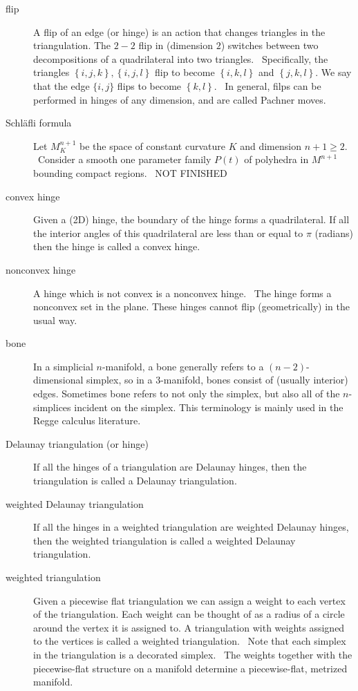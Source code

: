 \begin{description}
\item[flip] A flip of an edge (or hinge) is an action that changes triangles
in the triangulation. The $2-2$ flip in (dimension $2$) switches between two
decompositions of a quadrilateral into two triangles. \ Specifically, the
triangles $\left\{ i,j,k\right\} ,\left\{ i,j,l\right\} $ flip to become $%
\left\{ i,k,l\right\} $ and $\left\{ j,k,l\right\} $. We say that the edge $%
\{i,j\}$ flips to become $\left\{ k,l\right\} .$ \ In general, filps can be
performed in hinges of any dimension, and are called Pachner moves.

\item[Schl\"{a}fli formula] Let $M_{K}^{n+1}$ be the space of constant
curvature $K$ and dimension $n+1\geq 2$. \ Consider a smooth one parameter
family $P\left( t\right) $ of polyhedra in $M^{n+1}$ bounding compact
regions. \ NOT FINISHED

\item[convex hinge] Given a (2D) hinge, the boundary of the hinge forms a
quadrilateral. If all the interior angles of this quadrilateral are less
than or equal to $\pi $ (radians) then the hinge is called a convex hinge.

\item[nonconvex hinge] A hinge which is not convex is a nonconvex hinge. \
The hinge forms a nonconvex set in the plane. These hinges cannot flip
(geometrically) in the usual way.

\item[bone] In a simplicial $n$-manifold, a bone generally refers to a $%
\left( n-2\right) $-dimensional simplex, so in a $3$-manifold, bones consist
of (usually interior) edges. Sometimes bone refers to not only the simplex,
but also all of the $n$-simplices incident on the simplex. This terminology
is mainly used in the Regge calculus literature.

\item[Delaunay triangulation (or hinge)] If all the hinges of a
triangulation are Delaunay hinges, then the triangulation is called a
Delaunay triangulation.

\item[weighted Delaunay triangulation] If all the hinges in a weighted
triangulation are weighted Delaunay hinges, then the weighted triangulation
is called a weighted Delaunay triangulation.

\item[weighted triangulation] Given a piecewise flat triangulation we can
assign a weight to each vertex of the triangulation. Each weight can be
thought of as a radius of a circle around the vertex it is assigned to. A
triangulation with weights assigned to the vertices is called a weighted
triangulation. \ Note that each simplex in the triangulation is a decorated
simplex. \ The weights together with the piecewise-flat structure on a
manifold determine a piecewise-flat, metrized manifold.


\end{description}
